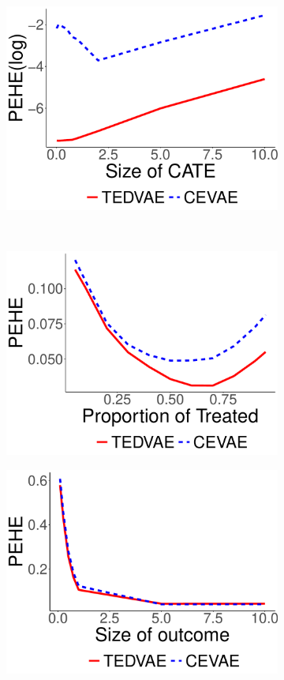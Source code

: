 \documentclass[letterpaper]{article} %
\begin{document}
\begin{figure}[!t]
\begin{subfigure}{0.15\textwidth}
		\includegraphics[width=\linewidth]{synthetic2_gamma.pdf}
	\end{subfigure}
	\\
	\begin{subfigure}{0.15\textwidth}
		\includegraphics[width=\linewidth]{synthetic1_alpha.pdf}
	\end{subfigure}
	\begin{subfigure}{0.15\textwidth}
		\includegraphics[width=\linewidth]{synthetic1_beta.pdf}

\end{subfigure}
\end{figure}
\end{document}
